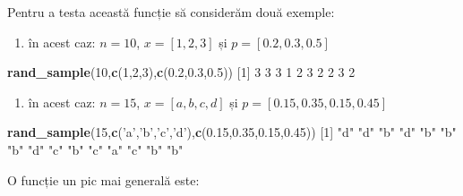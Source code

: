 \documentclass[]{article}
\newenvironment{Shaded}{\begin{snugshade}}{\end{snugshade}}
\newcommand{\KeywordTok}[1]{\textcolor[rgb]{0.13,0.29,0.53}{\textbf{#1}}}
\newcommand{\DecValTok}[1]{\textcolor[rgb]{0.00,0.00,0.81}{#1}}
\newcommand{\FloatTok}[1]{\textcolor[rgb]{0.00,0.00,0.81}{#1}}
\newcommand{\StringTok}[1]{\textcolor[rgb]{0.31,0.60,0.02}{#1}}
\newcommand{\NormalTok}[1]{#1}
\providecommand{\tightlist}{%
  \setlength{\itemsep}{0pt}\setlength{\parskip}{0pt}}
\begin{document}
Pentru a testa această funcție să considerăm două exemple:

\begin{enumerate}
\def\labelenumi{\arabic{enumi}.}
\tightlist
\item
  în acest caz: \(n=10\), \(x=[1,2,3]\) și \(p=[0.2,0.3,0.5]\)
\end{enumerate}

\begin{Shaded}
\begin{Highlighting}[]
\KeywordTok{rand_sample}\NormalTok{(}\DecValTok{10}\NormalTok{,}\KeywordTok{c}\NormalTok{(}\DecValTok{1}\NormalTok{,}\DecValTok{2}\NormalTok{,}\DecValTok{3}\NormalTok{),}\KeywordTok{c}\NormalTok{(}\FloatTok{0.2}\NormalTok{,}\FloatTok{0.3}\NormalTok{,}\FloatTok{0.5}\NormalTok{))}
\NormalTok{ [}\DecValTok{1}\NormalTok{] }\DecValTok{3} \DecValTok{3} \DecValTok{3} \DecValTok{1} \DecValTok{2} \DecValTok{3} \DecValTok{2} \DecValTok{2} \DecValTok{3} \DecValTok{2}
\end{Highlighting}
\end{Shaded}

\begin{enumerate}
\def\labelenumi{\arabic{enumi}.}
\setcounter{enumi}{1}
\tightlist
\item
  în acest caz: \(n=15\), \(x=[a,b,c,d]\) și \(p=[0.15,0.35,0.15,0.45]\)
\end{enumerate}

\begin{Shaded}
\begin{Highlighting}[]
\KeywordTok{rand_sample}\NormalTok{(}\DecValTok{15}\NormalTok{,}\KeywordTok{c}\NormalTok{(}\StringTok{'a'}\NormalTok{,}\StringTok{'b'}\NormalTok{,}\StringTok{'c'}\NormalTok{,}\StringTok{'d'}\NormalTok{),}\KeywordTok{c}\NormalTok{(}\FloatTok{0.15}\NormalTok{,}\FloatTok{0.35}\NormalTok{,}\FloatTok{0.15}\NormalTok{,}\FloatTok{0.45}\NormalTok{))}
\NormalTok{ [}\DecValTok{1}\NormalTok{] }\StringTok{"d"} \StringTok{"d"} \StringTok{"b"} \StringTok{"d"} \StringTok{"b"} \StringTok{"b"} \StringTok{"b"} \StringTok{"d"} \StringTok{"c"} \StringTok{"b"} \StringTok{"c"} \StringTok{"a"} \StringTok{"c"} \StringTok{"b"} \StringTok{"b"}
\end{Highlighting}
\end{Shaded}

O funcție un pic mai generală este:
\end{document}
